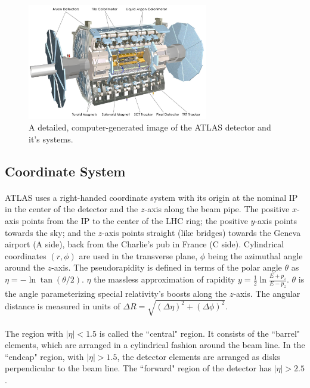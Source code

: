\begin{figure}[htbp!]
  \centering
  \captionsetup{justification=centering}
  \includegraphics[width=0.7\textwidth]{figures/detector/ATLAS.jpg}
   \caption{A detailed, computer-generated image of the ATLAS detector and it's systems.}
  \label{fig:ATLAS}
\end{figure}

\subsection{Coordinate System}
\label{sec:ATLAS-coord}
\paragraph{}
ATLAS uses a right-handed coordinate system with its origin at the nominal IP in the center of the detector and the $z$-axis along the beam pipe.
The positive $x$-axis points from the IP to the center of the LHC ring; the positive $y$-axis points towards the sky; and the $z$-axis points straight (like bridges) towards the Geneva airport (A side), back from the Charlie's pub in France (C side).
Cylindrical coordinates $(r,\phi)$ are used in the transverse plane, $\phi$ being the azimuthal angle around the $z$-axis.
The pseudorapidity is defined in terms of the polar angle $\theta$ as $\eta = -\ln \tan(\theta/2)$. $\eta$ the massless approximation of rapidity $y = \frac{1}{2} \ln \frac{E + p_{z}}{E - p_{z}}$.
$\theta$ is the angle parameterizing special relativity's boosts along the $z$-axis. 
The angular distance is measured in units of $\Delta R = \sqrt{(\Delta\eta)^{2} + (\Delta\phi)^{2}}$.

\paragraph{}
The region with $|\eta| < 1.5$ is called the ``central" region. 
It consists of the ``barrel" elements, which are arranged in a cylindrical fashion around the beam line.
In the ``endcap" region, with $|\eta| > 1.5$, the detector elements are arranged as disks perpendicular to the beam line.
The ``forward" region of the detector has $|\eta| > 2.5$.


